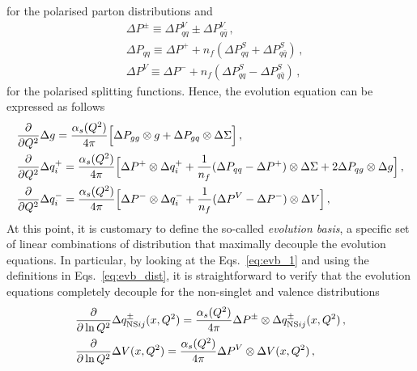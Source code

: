 for the polarised parton distributions and
\begin{equation}
  \begin{split}
    & \Delta P^{\pm} \equiv \Delta P_{qq}^{V} \pm \Delta P_{q \bar{q}}^{V} \,,\\
    & \Delta P_{qq} \equiv \Delta P^{+} + n_{f} (\Delta P_{qq}^{S} + \Delta P_{q\bar{q}}^{S} )  \,,\\
    & \Delta P^{V} \equiv \Delta P^{-} + n_{f} (\Delta P_{qq}^{S} - \Delta P_{q \bar{q}}^{S}) \,,
  \end{split}
\end{equation}
for the polarised splitting functions. Hence, the evolution equation can be expressed as follows
\begin{equation}
  \begin{split}
    & \frac{\partial}{\partial Q^2} \Delta g  = \frac{\alpha_{s}(Q^2)}{4 \pi} \Bigl[ \Delta P_{gg} \otimes g + \Delta P_{gq} \otimes \Delta \Sigma \Bigr] \,,\\
    & \frac{\partial}{\partial Q^2} \Delta q^{+}_{i} = \frac{\alpha_{s}(Q^2)}{4 \pi} \Bigl[ \Delta P^{+} \otimes \Delta q_{i}^{+} + \frac{1}{n_f} (\Delta P_{qq} - \Delta P^{+}) \otimes \Delta \Sigma + 2 \Delta P_{qg} \otimes \Delta g \Bigr] \,,\\
    & \frac{\partial}{\partial Q^2} \Delta q^{-}_{i} = \frac{\alpha_{s}(Q^2)}{4 \pi} \Bigl[ \Delta P^{-} \otimes \Delta q_{i}^{-} + \frac{1}{n_f} (\Delta P^{V} - \Delta P^{-}) \otimes \Delta V \Bigr] \,,\\
  \end{split}
  \label{eq:evb_1}
\end{equation}
At this point, it is customary to define the so-called \textit{evolution basis}, a specific set of linear combinations of distribution that maximally decouple the evolution equations. In particular, by looking at the Eqs.~\eqref{eq:evb_1} and using the definitions in Eqs.~\eqref{eq:evb_dist}, it is straightforward to verify that the evolution equations completely decouple for the non-singlet and valence distributions
\begin{equation}
  \begin{split}
    & \frac{\partial}{\partial \ln Q^2}\Delta q_{\textrm{NS}ij}^{\pm} (x,Q^2) = \frac{\alpha_s(Q^2)}{4\pi} \Delta P^{\pm} \otimes \Delta q_{{\textrm{NS}ij}}^{\pm} (x,Q^2) \,, \\
    & \frac{\partial}{\partial \ln Q^2}\Delta V (x,Q^2) = \frac{\alpha_s(Q^2)}{4\pi} \Delta P^{V} \otimes \Delta V (x,Q^2)\,,
  \end{split}
\end{equation}
